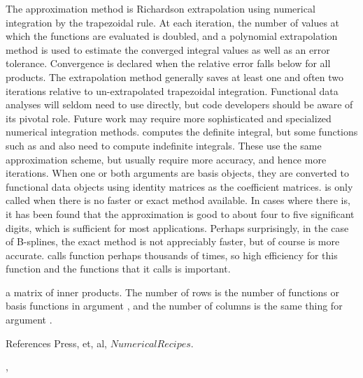 \documentclass{article}
\begin{document}
\begin{Details}\relax
The approximation method is Richardson extrapolation using numerical
integration by the trapezoidal rule.  At each iteration, the number of
values at which the functions are evaluated is doubled, and a polynomial
extrapolation method is used to estimate the converged integral values
as well as an error tolerance.  Convergence is declared when the
relative error falls below  for all products.  The
extrapolation method generally saves at least one and often two
iterations relative to un-extrapolated trapezoidal integration.
Functional data analyses will seldom need to use 
directly, but code developers should be aware of its pivotal role.
Future work may require more sophisticated and specialized numerical
integration methods.
 computes the definite integral, but some functions
such as  and  also need to
compute indefinite integrals.  These use the same approximation scheme,
but usually require more accuracy, and hence more iterations.
When one or both arguments are basis objects, they are converted to
functional data objects using identity matrices as the coefficient
matrices.
 is only called when there is no faster or exact
method available.  In cases where there is, it has been found that the
approximation is good to about four to five significant digits, which is
sufficient for most applications.  Perhaps surprisingly, in the case of
B-splines, the exact method is not appreciably faster, but of course is
more accurate.
 calls function  perhaps thousands
of times, so high efficiency for this function and the functions that
it calls is important.
\end{Details}
\begin{Value}
a matrix of inner products.  The number of rows is the number of
functions or basis functions in argument , and the number of
columns is the same thing for argument .
\end{Value}
\begin{Section}{References}
Press, et, al, $Numerical Recipes$.
\end{Section}
\begin{SeeAlso}\relax
{},
\end{SeeAlso}
\end{document}
